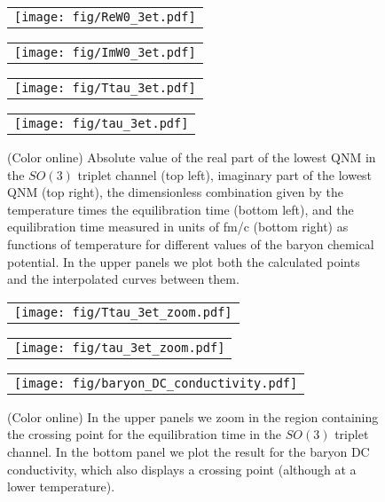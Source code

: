 \documentclass[aps,prd,showkeys,superscriptaddress,singlecolumn,nofootinbib,floatfix]{revtex4-1}
\begin{document}
\begin{figure*}
\begin{center}
\begin{tabular}{c}
\texttt{[image: fig/ReW0\_3et.pdf]} %
\end{tabular}
\begin{tabular}{c}
\texttt{[image: fig/ImW0\_3et.pdf]} %
\end{tabular}
\begin{tabular}{c}
\texttt{[image: fig/Ttau\_3et.pdf]} %
\end{tabular}
\begin{tabular}{c}
\texttt{[image: fig/tau\_3et.pdf]} %
\end{tabular}
\end{center}
\caption{{\small (Color online) Absolute value of the real part of the lowest QNM in the $SO(3)$ triplet channel (top left), imaginary part of the lowest QNM (top right), the dimensionless combination given by the temperature times the equilibration time (bottom left), and the equilibration time measured in units of fm/c (bottom right) as functions of temperature for different values of the baryon chemical potential. In the upper panels we plot both the calculated points and the interpolated curves between them.}
\label{fig:3et}}
\end{figure*}

\begin{figure*}
\begin{center}
\begin{tabular}{c}
\texttt{[image: fig/Ttau\_3et\_zoom.pdf]} %
\end{tabular}
\begin{tabular}{c}
\texttt{[image: fig/tau\_3et\_zoom.pdf]} %
\end{tabular}
\begin{tabular}{c}
\texttt{[image: fig/baryon\_DC\_conductivity.pdf]} %
\end{tabular}
\end{center}
\caption{{\small (Color online) In the upper panels we zoom in the region containing the crossing point for the equilibration time in the $SO(3)$ triplet channel. In the bottom panel we plot the result for the baryon DC conductivity, which also displays a crossing point (although at a lower temperature).}
\label{fig:3et_zoom}}
\end{figure*}
\end{document}
